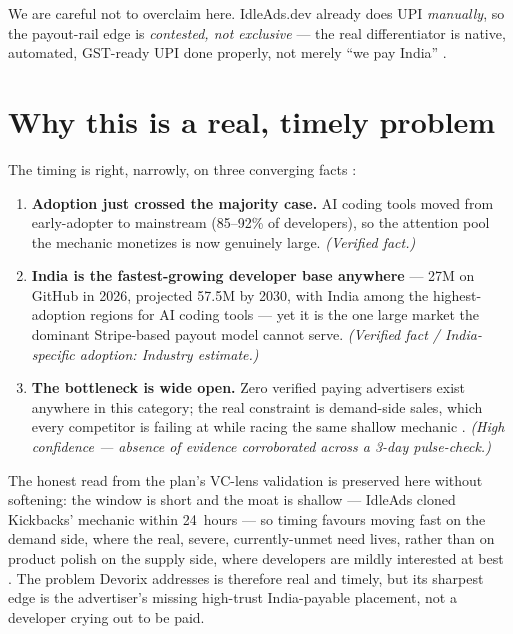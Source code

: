 We are careful not to overclaim here. IdleAds.dev already does UPI
\emph{manually}, so the payout-rail edge is \emph{contested, not exclusive} ---
the real differentiator is native, automated, GST-ready UPI done properly,
not merely ``we pay India'' \citep{masterplan_2026}.

\section{Why this is a real, timely problem}

The timing is right, narrowly, on three converging facts
\citep{masterplan_2026}:

\begin{enumerate}
  \item \textbf{Adoption just crossed the majority case.} AI coding tools moved
        from early-adopter to mainstream (85--92\% of developers), so the
        attention pool the mechanic monetizes is now genuinely large.
        \emph{(Verified fact.)}
  \item \textbf{India is the fastest-growing developer base anywhere} --- 27M
        on GitHub in 2026, projected 57.5M by 2030, with India among the
        highest-adoption regions for AI coding tools --- yet it is the one
        large market the dominant Stripe-based payout model cannot serve.
        \emph{(Verified fact / India-specific adoption: Industry estimate.)}
  \item \textbf{The bottleneck is wide open.} Zero verified paying advertisers
        exist anywhere in this category; the real constraint is demand-side
        sales, which every competitor is failing at while racing the same
        shallow mechanic \citep{masterplan_2026}. \emph{(High confidence ---
        absence of evidence corroborated across a 3-day pulse-check.)}
\end{enumerate}

The honest read from the plan's VC-lens validation is preserved here without
softening: the window is short and the moat is shallow --- IdleAds cloned
Kickbacks' mechanic within 24~hours --- so timing favours moving fast on the
demand side, where the real, severe, currently-unmet need lives, rather than on
product polish on the supply side, where developers are mildly interested at
best \citep{masterplan_2026}. The problem Devorix addresses is therefore
real and timely, but its sharpest edge is the advertiser's missing high-trust
India-payable placement, not a developer crying out to be paid.
